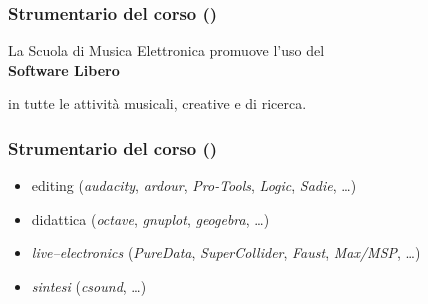 %
%
%
%
%
\setcounter{ms}{1}
\begin{frame}
    \frametitle<+->{Strumentario del corso ()}

    \begin{center}
    La Scuola di Musica Elettronica promuove l'uso del\\[\baselineskip]

    {\Large {\bfseries Software Libero}}
    \vspace{\baselineskip}

    in tutte le attivit\`a musicali, creative e di ricerca.
    \end{center}

\end{frame}

\begin{frame}
    \frametitle{Strumentario del corso ()}

	\begin{itemize}

    \item editing (\emph{audacity}, \emph{ardour},
                  \emph{Pro-Tools}, \emph{Logic}, \emph{Sadie}, \ldots)

    \item didattica (\emph{octave}, \emph{gnuplot}, \emph{geogebra}, \ldots)

    \item \emph{live--electronics} (\emph{PureData}, \emph{SuperCollider},
            \emph{Faust}, \emph{Max/MSP}, \ldots)


    \item \emph{sintesi} (\emph{csound}, \ldots)

	\end{itemize}

\end{frame}

